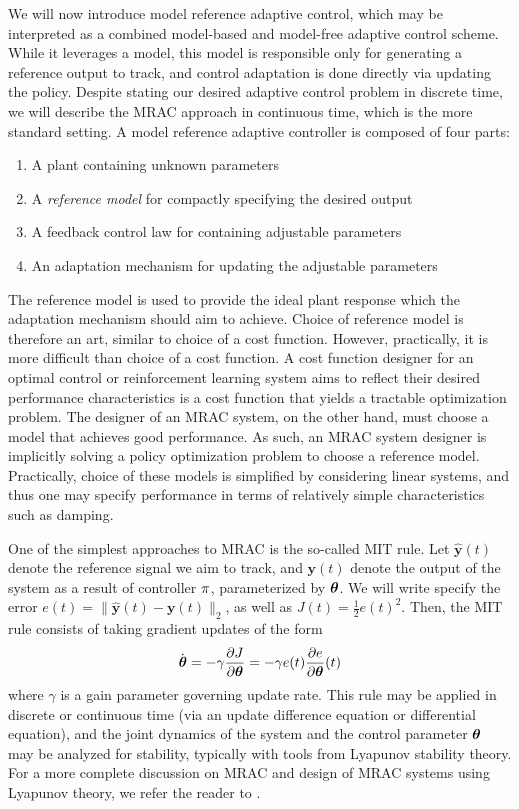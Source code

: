 We will now introduce model reference adaptive control, which may be interpreted as a combined model-based and model-free adaptive control scheme. While it leverages a model, this model is responsible only for generating a reference output to track, and control adaptation is done directly via updating the policy. 
Despite stating our desired adaptive control problem in discrete time, we will describe the MRAC approach in continuous time, which is the more standard setting. 
A model reference adaptive controller is composed of four parts:
\begin{enumerate}
    \item A plant containing unknown parameters
    \item A \textit{reference model} for compactly specifying the desired output
    \item A feedback control law for containing adjustable parameters
    \item An adaptation mechanism for updating the adjustable parameters
\end{enumerate}
The reference model is used to provide the ideal plant response which the adaptation mechanism should aim to achieve. Choice of reference model is therefore an art, similar to choice of a cost function. However, practically, it is more difficult than choice of a cost function. A cost function designer for an optimal control or reinforcement learning system aims to reflect their desired performance characteristics is a cost function that yields a tractable optimization problem. The designer of an MRAC system, on the other hand, must choose a model that achieves good performance. As such, an MRAC system designer is implicitly solving a policy optimization problem to choose a reference model. Practically, choice of these models is simplified by considering linear systems, and thus one may specify performance in terms of relatively simple characteristics such as damping. 

One of the simplest approaches to MRAC is the so-called MIT rule. Let $\hat{\bm{y}}(t)$ denote the reference signal we aim to track, and $\bm{y}(t)$ denote the output of the system as a result of controller $\pi$, parameterized by $\bm{\theta}$. We will write specify the error $e(t) = \| \hat{\bm{y}}(t) - \bm{y}(t) \|_2$, as well as $J(t) = \frac{1}{2} e(t)^2$. Then, the MIT rule consists of taking gradient updates of the form 
\begin{equation}
    \dot{\bm{\theta}} = -\gamma \frac{\partial J}{\partial \bm{\theta}} = - \gamma e(t) \frac{\partial e}{\partial \bm{\theta}}(t)
\end{equation}
where $\gamma$ is a gain parameter governing update rate. This rule may be applied in discrete or continuous time (via an update difference equation or differential equation), and the joint dynamics of the system and the control parameter $\bm{\theta}$ may be analyzed for stability, typically with tools from Lyapunov stability theory. For a more complete discussion on MRAC and design of MRAC systems using Lyapunov theory, we refer the reader to \cite{aastrom2013adaptive}.

